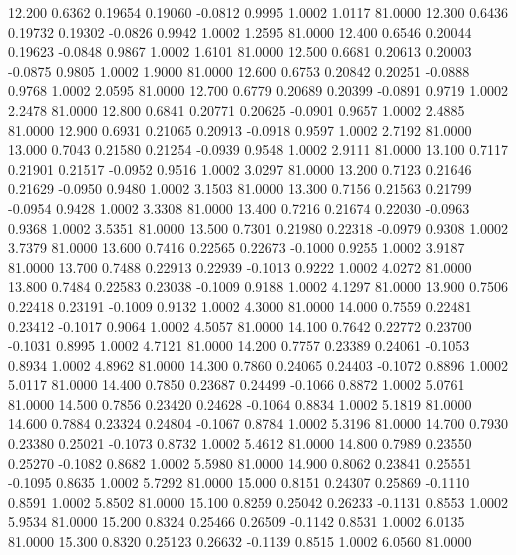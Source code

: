   12.200   0.6362   0.19654   0.19060  -0.0812   0.9995   1.0002   1.0117  81.0000
  12.300   0.6436   0.19732   0.19302  -0.0826   0.9942   1.0002   1.2595  81.0000
  12.400   0.6546   0.20044   0.19623  -0.0848   0.9867   1.0002   1.6101  81.0000
  12.500   0.6681   0.20613   0.20003  -0.0875   0.9805   1.0002   1.9000  81.0000
  12.600   0.6753   0.20842   0.20251  -0.0888   0.9768   1.0002   2.0595  81.0000
  12.700   0.6779   0.20689   0.20399  -0.0891   0.9719   1.0002   2.2478  81.0000
  12.800   0.6841   0.20771   0.20625  -0.0901   0.9657   1.0002   2.4885  81.0000
  12.900   0.6931   0.21065   0.20913  -0.0918   0.9597   1.0002   2.7192  81.0000
  13.000   0.7043   0.21580   0.21254  -0.0939   0.9548   1.0002   2.9111  81.0000
  13.100   0.7117   0.21901   0.21517  -0.0952   0.9516   1.0002   3.0297  81.0000
  13.200   0.7123   0.21646   0.21629  -0.0950   0.9480   1.0002   3.1503  81.0000
  13.300   0.7156   0.21563   0.21799  -0.0954   0.9428   1.0002   3.3308  81.0000
  13.400   0.7216   0.21674   0.22030  -0.0963   0.9368   1.0002   3.5351  81.0000
  13.500   0.7301   0.21980   0.22318  -0.0979   0.9308   1.0002   3.7379  81.0000
  13.600   0.7416   0.22565   0.22673  -0.1000   0.9255   1.0002   3.9187  81.0000
  13.700   0.7488   0.22913   0.22939  -0.1013   0.9222   1.0002   4.0272  81.0000
  13.800   0.7484   0.22583   0.23038  -0.1009   0.9188   1.0002   4.1297  81.0000
  13.900   0.7506   0.22418   0.23191  -0.1009   0.9132   1.0002   4.3000  81.0000
  14.000   0.7559   0.22481   0.23412  -0.1017   0.9064   1.0002   4.5057  81.0000
  14.100   0.7642   0.22772   0.23700  -0.1031   0.8995   1.0002   4.7121  81.0000
  14.200   0.7757   0.23389   0.24061  -0.1053   0.8934   1.0002   4.8962  81.0000
  14.300   0.7860   0.24065   0.24403  -0.1072   0.8896   1.0002   5.0117  81.0000
  14.400   0.7850   0.23687   0.24499  -0.1066   0.8872   1.0002   5.0761  81.0000
  14.500   0.7856   0.23420   0.24628  -0.1064   0.8834   1.0002   5.1819  81.0000
  14.600   0.7884   0.23324   0.24804  -0.1067   0.8784   1.0002   5.3196  81.0000
  14.700   0.7930   0.23380   0.25021  -0.1073   0.8732   1.0002   5.4612  81.0000
  14.800   0.7989   0.23550   0.25270  -0.1082   0.8682   1.0002   5.5980  81.0000
  14.900   0.8062   0.23841   0.25551  -0.1095   0.8635   1.0002   5.7292  81.0000
  15.000   0.8151   0.24307   0.25869  -0.1110   0.8591   1.0002   5.8502  81.0000
  15.100   0.8259   0.25042   0.26233  -0.1131   0.8553   1.0002   5.9534  81.0000
  15.200   0.8324   0.25466   0.26509  -0.1142   0.8531   1.0002   6.0135  81.0000
  15.300   0.8320   0.25123   0.26632  -0.1139   0.8515   1.0002   6.0560  81.0000
